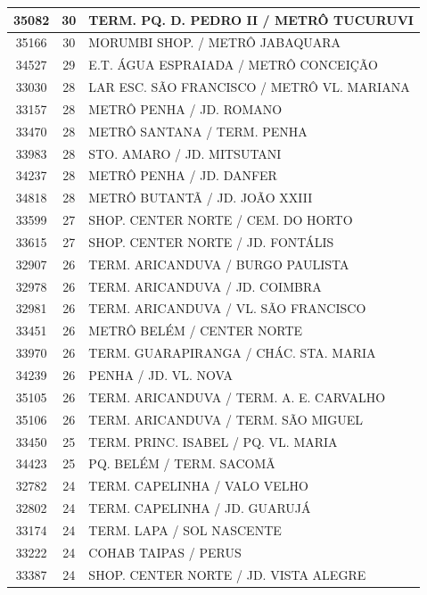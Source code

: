 \documentclass[
	12pt,				%
	oneside,			%
	a4paper,			%
	english,			%
	brazil				%
	]{abntex2ppgsi}
\begin{document}
\begin{apendicesenv}
\begin{longtable}{c|c|p{7cm}}
\hline
    35082 & 30    & TERM. PQ. D. PEDRO II / METRÔ TUCURUVI \\
\hline
    35166 & 30    & MORUMBI SHOP. / METRÔ JABAQUARA \\
\hline
    34527 & 29    & E.T. ÁGUA ESPRAIADA / METRÔ CONCEIÇÃO \\
\hline
    33030 & 28    & LAR ESC. SÃO FRANCISCO / METRÔ VL. MARIANA \\
\hline
    33157 & 28    & METRÔ PENHA / JD. ROMANO \\
\hline
    33470 & 28    & METRÔ SANTANA / TERM. PENHA \\
\hline
    33983 & 28    & STO. AMARO / JD. MITSUTANI \\
\hline
    34237 & 28    & METRÔ PENHA / JD. DANFER \\
\hline
    34818 & 28    & METRÔ BUTANTÃ / JD. JOÃO XXIII \\
\hline
    33599 & 27    & SHOP. CENTER NORTE / CEM. DO HORTO \\
\hline
    33615 & 27    & SHOP. CENTER NORTE / JD. FONTÁLIS \\
\hline
    32907 & 26    & TERM. ARICANDUVA / BURGO PAULISTA \\
\hline
    32978 & 26    & TERM. ARICANDUVA / JD. COIMBRA \\
\hline
    32981 & 26    & TERM. ARICANDUVA / VL. SÃO FRANCISCO \\
\hline
    33451 & 26    & METRÔ BELÉM / CENTER NORTE \\
\hline
    33970 & 26    & TERM. GUARAPIRANGA / CHÁC. STA. MARIA \\
\hline
    34239 & 26    & PENHA / JD. VL. NOVA \\
\hline
    35105 & 26    & TERM. ARICANDUVA / TERM. A. E. CARVALHO \\
\hline
    35106 & 26    & TERM. ARICANDUVA / TERM. SÃO MIGUEL \\
\hline
    33450 & 25    & TERM. PRINC. ISABEL / PQ. VL. MARIA \\
\hline
    34423 & 25    & PQ. BELÉM / TERM. SACOMÃ \\
\hline
    32782 & 24    & TERM. CAPELINHA / VALO VELHO \\
\hline
    32802 & 24    & TERM. CAPELINHA / JD. GUARUJÁ \\
\hline
    33174 & 24    & TERM. LAPA / SOL NASCENTE \\
\hline
    33222 & 24    & COHAB TAIPAS / PERUS \\
\hline
    33387 & 24    & SHOP. CENTER NORTE / JD. VISTA ALEGRE \\

\end{longtable}
\end{apendicesenv}
\end{document}
